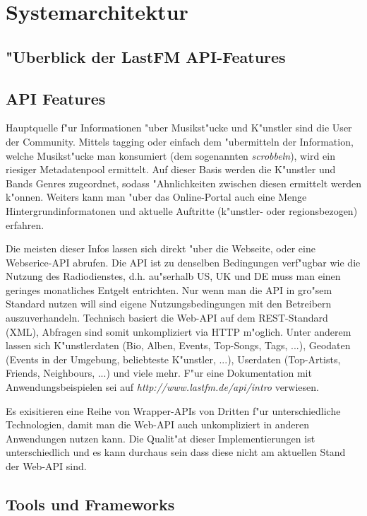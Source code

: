 \section{Systemarchitektur}

\subsection{"Uberblick der LastFM API-Features}
\subsection{API Features}
\label{features_lastfm}
Hauptquelle f"ur Informationen "uber Musikst"ucke und K"unstler sind die User der Community. Mittels tagging oder einfach dem "ubermitteln der Information, welche Musikst"ucke man konsumiert (dem sogenannten \textit{scrobbeln}), wird ein riesiger Metadatenpool ermittelt. Auf dieser Basis werden die K"unstler und Bands Genres zugeordnet, sodass "Ahnlichkeiten zwischen diesen ermittelt werden k"onnen. 
Weiters kann man "uber das Online-Portal auch eine Menge Hintergrundinformatonen und aktuelle Auftritte (k"unstler- oder regionsbezogen) erfahren. 

Die meisten dieser Infos lassen sich direkt "uber die Webseite, oder eine Webserice-API abrufen. Die API ist zu denselben Bedingungen verf"ugbar wie die Nutzung des Radiodienstes, d.h. au"serhalb US, UK und DE muss man einen geringes monatliches Entgelt entrichten. Nur wenn man die API in gro"sem Standard nutzen will sind eigene Nutzungsbedingungen mit den Betreibern auszuverhandeln.
Technisch basiert die Web-API auf dem REST-Standard (XML), Abfragen sind somit unkompliziert via HTTP m"oglich. Unter anderem lassen sich K"unstlerdaten (Bio, Alben, Events, Top-Songs, Tags, ...), Geodaten (Events in der Umgebung, beliebteste K"unstler, ...), Userdaten (Top-Artists, Friends, Neighbours, ...) und viele mehr. F"ur eine Dokumentation mit Anwendungsbeispielen sei auf \textit{http://www.lastfm.de/api/intro} verwiesen. 

Es exisitieren eine Reihe von Wrapper-APIs von Dritten f"ur unterschiedliche Technologien, damit man die Web-API auch unkompliziert in anderen Anwendungen nutzen kann. Die Qualit"at dieser Implementierungen ist unterschiedlich und es kann durchaus sein dass diese nicht am aktuellen Stand der Web-API sind. 


\subsection{Tools und Frameworks}


